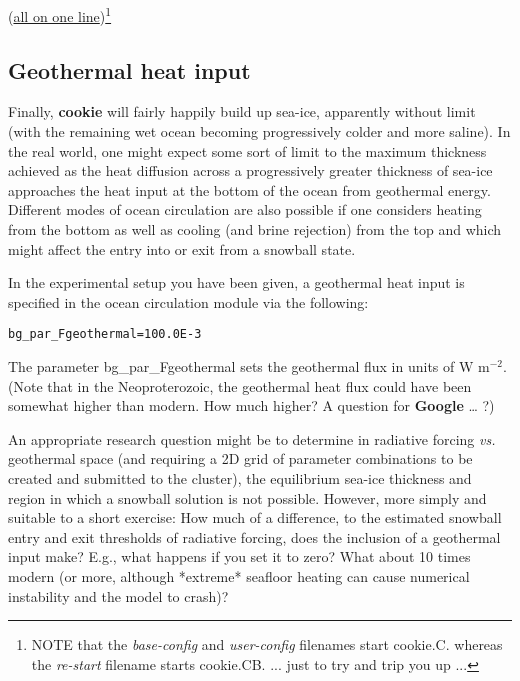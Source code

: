 \noindent (\uline{all on one line})\footnote{NOTE that the \textit{base-config} and \textit{user-config} filenames start \textsf{\footnotesize cookie.C.} whereas the\textit{ re-start} filename starts \textsf{\footnotesize cookie.CB.} ... just to try and trip you up ...}

\vspace{1mm}


\subsection{Geothermal heat input}

Finally, \textbf{cookie} will fairly happily build up sea-ice, apparently without limit (with the remaining wet ocean becoming progressively colder and more saline). In the real world, one might expect some sort of limit to the maximum thickness achieved as the heat diffusion across a progressively greater thickness of sea-ice approaches the heat input at the bottom of the ocean from geothermal energy. Different modes of ocean circulation are also possible if one considers heating from the bottom as well as cooling (and brine rejection) from the top and which might affect the entry into or exit from a snowball state.

\newpage

In the experimental setup you have been given, a geothermal heat input is specified in the ocean circulation module via the following:

\vspace{-2mm}
\small\begin{verbatim}
bg_par_Fgeothermal=100.0E-3
\end{verbatim}\normalsize
\vspace{-2mm}

The parameter \textsf{\footnotesize bg\_par\_Fgeothermal} sets the geothermal flux in units of W m$^{-2}$. (Note that in the Neoproterozoic, the geothermal heat flux could have been somewhat higher than modern. How much higher? A question for \textbf{Google} … ?)

An appropriate research question might be to determine in radiative forcing \textit{vs.} geothermal space (and requiring a 2D grid of parameter combinations to be created and submitted to the cluster), the equilibrium sea-ice thickness and region in which a snowball solution is not possible. However, more simply and suitable to a short exercise: How much of a difference, to the estimated snowball entry and exit thresholds of radiative forcing, does the inclusion of a geothermal input make? E.g., what happens if you set it to zero? What about 10 times modern (or more, although *extreme* seafloor heating can cause numerical instability and the model to crash)?

